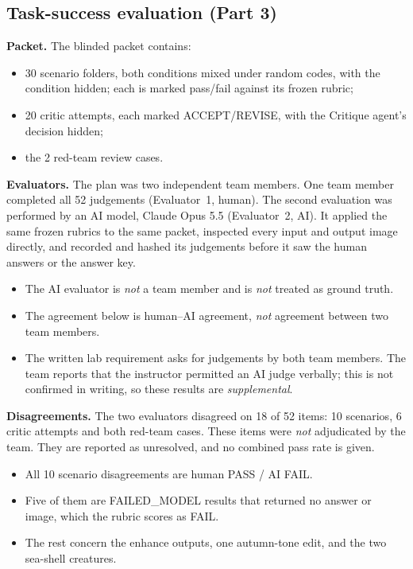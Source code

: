 \documentclass[conference]{IEEEtran}
\begin{document}
\subsection{Task-success evaluation (Part 3)}\label{sec:human3}
\textbf{Packet.} The blinded packet contains:
\begin{itemize}
\item 30 scenario folders, both conditions mixed under random codes, with the condition hidden; each is marked pass/fail against its frozen rubric;
\item 20 critic attempts, each marked ACCEPT/REVISE, with the Critique agent's decision hidden;
\item the 2 red-team review cases.
\end{itemize}

\textbf{Evaluators.} The plan was two independent team members. One team member completed all 52 judgements (Evaluator~1, human). The second evaluation was performed by an AI model, Claude Opus 5.5 (Evaluator~2, AI). It applied the same frozen rubrics to the same packet, inspected every input and output image directly, and recorded and hashed its judgements before it saw the human answers or the answer key.
\begin{itemize}
\item The AI evaluator is \emph{not} a team member and is \emph{not} treated as ground truth.
\item The agreement below is human--AI agreement, \emph{not} agreement between two team members.
\item The written lab requirement asks for judgements by both team members. The team reports that the instructor permitted an AI judge verbally; this is not confirmed in writing, so these results are \emph{supplemental}.
\end{itemize}

\textbf{Disagreements.} The two evaluators disagreed on 18 of 52 items: 10 scenarios, 6 critic attempts and both red-team cases. These items were \emph{not} adjudicated by the team. They are reported as unresolved, and no combined pass rate is given.
\begin{itemize}
\item All 10 scenario disagreements are human PASS / AI FAIL.
\item Five of them are FAILED\_MODEL results that returned no answer or image, which the rubric scores as FAIL.
\item The rest concern the enhance outputs, one autumn-tone edit, and the two sea-shell creatures.
\end{itemize}
\end{document}

